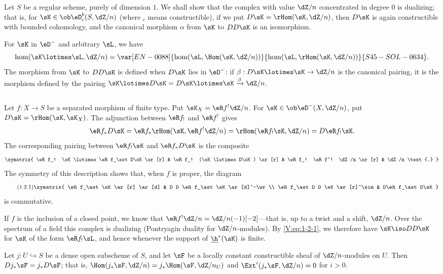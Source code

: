 Let $S$ be a regular scheme, purely of dimension $1$. We shall show that the
complex with value $\dZ/n$ concentrated in degree $0$ is dualizing; that is,
for $\sK\in \ob\eD_c^b(S,\dZ/n)$ (where ${}_c$ means constructible), if we
put $D\sK=\rHom(\sK,\dZ/n)$, then $D\sK$ is again
constructible with bounded cohomology, and the canonical morphism $\alpha$
from $\sK$ to $D D\sK$ is an isomorphism.

For $\sK$ in $\eD^-$ and arbitrary $\sL$, we have
\[
  \hom(\sK\lotimes \sL,\dZ/n) = \var[EN-0088]{\hom(\sL,\Hom(\sK,\dZ/n))}{\hom(\sL,\rHom(\sK,\dZ/n))}{S45-SOL-0634} \text{.}
\]
The morphism from $\sK$ to $DD\sK$ is defined when $D\sK$ lies in $\eD^-$:
if $\beta:D\sK\lotimes\sK\to \dZ/n$ is the canonical pairing, it is the
morphism defined by the pairing
$\sK\lotimes D\sK=D\sK\lotimes \sK \xrightarrow\beta \dZ/n$.


\subsection{}\label{V:1-2}

Let $f:X\to S$ be a separated morphism of finite type. Put
$\sK_X=\eR f^!\dZ/n$. For $\sK\in \ob\eD^-(X,\dZ/n)$, put
$D\sK = \rHom(\sK,\sK_X)$. The adjunction between $\eR f_!$ and $\eR f^!$
gives
\[
  \eR f_\ast D\sK = \eR f_\ast \rHom(\sK,\eR f^! \dZ/n) = \rHom(\eR f_! \sK,\dZ/n) = D\eR f_! \sK \text{.}
\]
The corresponding pairing between $\eR f_!\sK$ and $\eR f_\ast D\sK$ is the composite
\[\xymatrix{
  \eR f_! \sK\lotimes \eR f_\ast D\sK \ar[r]
    & \eR f_! (\sK\lotimes D\sK) \ar[r]
    & \eR f_! \eR f^! \dZ/n \ar[r]
    & \dZ/n \text{.}
}\]
The symmetry of this description shows that, when $f$ is proper, the diagram
\begin{equation*}\tag{1.2.1}\label{V:eq:1-2-1}
\xymatrix{
  \eR f_\ast \sK \ar[r] \ar[d]
    & D D \eR f_\ast \sK \ar[d]^-\wr \\
  \eR f_\ast D D \sK \ar[r]^\sim
    & D\eR f_\ast D\sK
}
\end{equation*}
is commutative.

If $f$ is the inclusion of a closed point, we know that
$\eR f^!\dZ/n=\dZ/n(-1)[-2]$---that is, up to a twist and a shift, $\dZ/n$.
Over the spectrum of a field this complex is dualizing (Pontryagin duality
for $\dZ/n$-modules). By \eqref{V:eq:1-2-1}, we therefore have
$\sK\iso D D\sK$ for $\sK$ of the form $\eR f_!\sL$, and hence whenever the
support of $\underline\h^*(\sK)$ is finite.


\begin{theorem_}\label{V:1-3}
Let $j:U\hookrightarrow S$ be a dense open subscheme of $S$, and let $\sF$
be a locally constant constructible sheaf of $\dZ/n$-modules on $U$. Then
$D j_\ast \sF = j_\ast D \sF$; that is,
$\Hom(j_\ast \sF,\dZ/n) = j_\ast\Hom(\sF,\dZ/n_U)$ and
$\Ext^i(j_\ast\sF,\dZ/n) = 0$ for $i>0$.
\end{theorem_}

